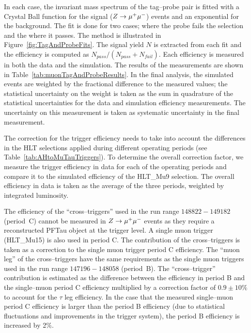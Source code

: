 In each case, the invariant mass spectrum of the tag--probe pair is fitted with
a Crystal Ball function for the signal ($\mbox{\ensuremath{Z\to\mu^+\mu^-}}$) events and an
exponential for the background.  The fit is done for two cases; where the probe
fails the selection and the where it passes.  The method is illustrated in
Figure~\ref{fig:TagAndProbeFits}.  The signal yield $N$ is extracted from each
fit and the efficiency is computed as $N_{pass}/(N_{pass} + N_{fail})$.  Each
efficiency is measured in both the data and the simulation. The results of the
measurements are shown in Table~\ref{tab:muonTagAndProbeResults}. In the final
analysis, the simulated events are weighted by the fractional difference to the
measured values; the statistical uncertainty on the weight is taken as the sum
in quadrature of the statistical uncertainties for the data and simulation
efficiency measurements.  The uncertainty on this measurement is taken as
systematic uncertainty in the final measurement.

The correction for the trigger efficiency needs to take into account the
differences in the HLT selections applied during different operating periods
(see Table~\ref{tab:AHtoMuTauTriggers}).  To determine the overall correction
factor, we measure the trigger efficiency in data for each of the operating
periods and compare it to the simulated efficiency of the HLT\_Mu9 selection.
The overall efficiency in data is taken as the average of the three periods,
weighted by integrated luminosity.

The efficiency of the ``cross--triggers'' used in the run range 
$148822-149182$ (period~C) cannot be measured in $\mbox{\ensuremath{Z\to\mu^+\mu^-}}$ events as they
require a reconstructed PFTau object at the trigger level.  A single muon trigger
(HLT\_Mu15) is also used in period C.  The contribution of the cross--triggers
is taken as a correction to the single muon trigger period C efficiency. The
``muon leg'' of the cross--triggers have the same requirements as the single
muon triggers used in the run range $147196-148058$ (period~B).  The
``cross--trigger'' contribution is estimated as the difference between the
efficiency in period B and the single--muon period C efficiency multiplied by a
correction factor of $0.9 \pm 10\%$ to account for the $\tau$ leg efficiency.
In the case that the measured single--muon period C efficiency is larger than
the period B efficiency (due to statistical fluctuations and improvements in the
trigger system), the period B efficiency is increased by 2\%.

